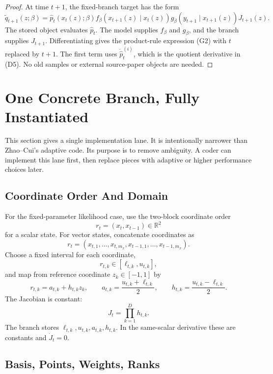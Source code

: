 \documentclass[11pt]{article}
\newcommand{\R}{\mathbb R}
\begin{document}
\begin{proof}
At time \(t+1\), the fixed-branch target has the form
\[
    \widetilde q_{t+1}(z;\beta)
    =
    \widehat p_t(x_t(z);\beta)
    f_\beta(x_{t+1}(z)\mid x_t(z))
    g_\beta(y_{t+1}\mid x_{t+1}(z))
    J_{t+1}(z).
\]
The stored object evaluates \(\widehat p_t\).  The model supplies \(f_\beta\)
and \(g_\beta\), and the branch supplies \(J_{t+1}\).  Differentiating gives
the product-rule expression (G2) with \(t\) replaced by \(t+1\).  The first
term uses \(\dot{\widehat p}_t^{(i)}\), which is the quotient derivative in
(D5).  No old samples or external source-paper objects are needed.
\end{proof}

\section{One Concrete Branch, Fully Instantiated}

This section gives a single implementation lane.  It is intentionally narrower
than Zhao--Cui's adaptive code.  Its purpose is to remove ambiguity.  A coder
can implement this lane first, then replace pieces with adaptive or higher
performance choices later.

\subsection{Coordinate Order And Domain}

For the fixed-parameter likelihood case, use the two-block coordinate order
\[
    r_t=(x_t,x_{t-1})\in\R^2
\]
for a scalar state.  For vector states, concatenate coordinates as
\[
    r_t=(x_{t,1},\ldots,x_{t,m_x},x_{t-1,1},\ldots,x_{t-1,m_x}).
\]
Choose a fixed interval for each coordinate,
\[
    r_{t,k}\in[\ell_{t,k},u_{t,k}],
\]
and map from reference coordinate \(z_k\in[-1,1]\) by
\[
    r_{t,k}=a_{t,k}+h_{t,k}z_k,\qquad
    a_{t,k}=\frac{u_{t,k}+\ell_{t,k}}2,\qquad
    h_{t,k}=\frac{u_{t,k}-\ell_{t,k}}2.
    \tag{C1}
\]
The Jacobian is constant:
\[
    J_t=\prod_{k=1}^{D}h_{t,k}.
    \tag{C2}
\]
The branch stores \(\ell_{t,k},u_{t,k},a_{t,k},h_{t,k}\).  In the same-scalar
derivative these are constants and \(\dot J_t=0\).

\subsection{Basis, Points, Weights, Ranks}
\end{document}
